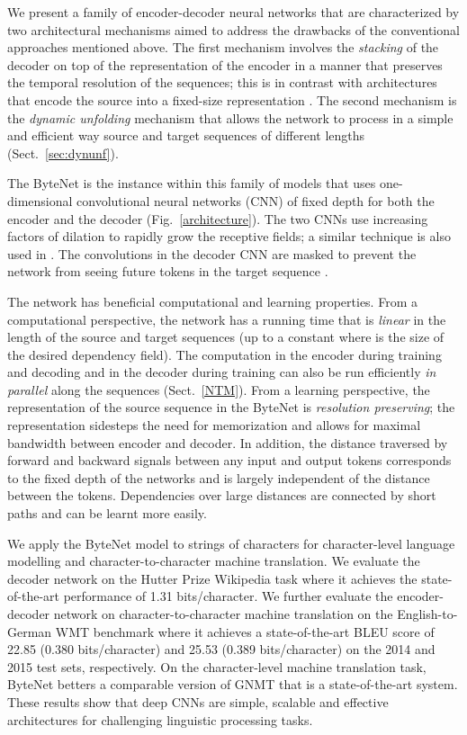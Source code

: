 \documentclass{article}
\newcommand{\figref}[1]{Fig.~\ref{#1}}
\begin{document}
We present a family of encoder-decoder neural networks that are characterized by two architectural mechanisms aimed to address the drawbacks of the conventional approaches mentioned above. The first mechanism involves the \emph{stacking} of the decoder on top of the representation of the encoder in a manner that preserves the temporal resolution of the sequences; this is in contrast with architectures that encode the source into a fixed-size representation \citep{kalchbrenner13emnlp, DBLP:conf/nips/SutskeverVL14}.  The second mechanism is the \emph{dynamic unfolding} mechanism that allows the network to process in a simple and efficient way source and target sequences of different lengths (Sect.~\ref{sec:dynunf}).



The ByteNet is the instance within this family of models that uses one-dimensional convolutional neural networks (CNN) of fixed depth for both the encoder and the decoder (\figref{architecture}). The two CNNs use increasing factors of dilation to rapidly grow the receptive fields; a similar technique is also used in \citep{wavenet}. The convolutions in the decoder CNN are masked to prevent the network from seeing future tokens in the target sequence \citep{van2016pixel}.

The network has  beneficial computational and learning properties. From a computational perspective, the network has a running time that is \emph{linear} in the length of the source and target sequences (up to a constant  where  is the size of the desired dependency field). The computation in the encoder during training and decoding and in the decoder during training can also be run efficiently \emph{in parallel} along the sequences (Sect.~\ref{NTM}).
From a learning perspective, the representation of the source sequence in the ByteNet is \emph{resolution preserving}; the representation sidesteps the need for memorization and allows for maximal bandwidth between encoder and decoder. In addition, the distance traversed by forward and backward signals between any input and output tokens corresponds to the fixed depth of the networks and is largely independent of the distance between the tokens. Dependencies over large distances are connected by short paths and can be learnt more easily. 



We apply the ByteNet model to strings of characters for character-level language modelling and character-to-character machine translation. We evaluate the decoder network on the Hutter Prize Wikipedia task \citep{hutterprize} where it achieves the state-of-the-art performance of 1.31 bits/character. We further evaluate the encoder-decoder network on character-to-character machine translation on the English-to-German WMT benchmark where it achieves a state-of-the-art BLEU score of 22.85 (0.380 bits/character) and 25.53 (0.389 bits/character) on the 2014 and 2015 test sets, respectively. On the character-level machine translation task, ByteNet betters a comparable version of GNMT \citep{wu2016} that is a state-of-the-art system. These results show that deep CNNs are simple, scalable and effective architectures for challenging linguistic processing tasks.
\end{document}

